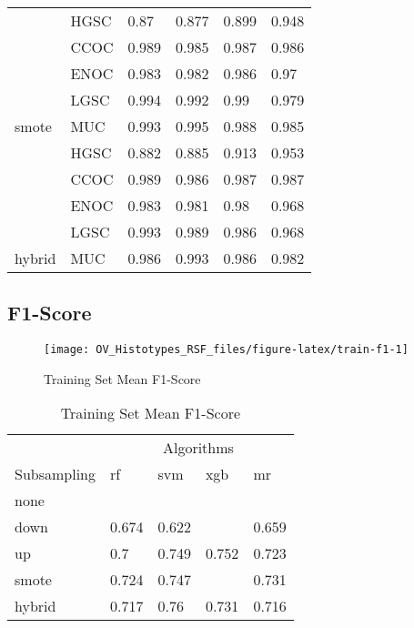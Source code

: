 \documentclass[
]{report}
\begin{document}
\begin{table}
\begin{tabular}[t]{l|l|l|l|l|l}
\cline{1-6}
 & HGSC & 0.87 & 0.877 & 0.899 & 0.948\\
\cline{2-6}
 & CCOC & 0.989 & 0.985 & 0.987 & 0.986\\
\cline{2-6}
 & ENOC & 0.983 & 0.982 & 0.986 & 0.97\\
\cline{2-6}
 & LGSC & 0.994 & 0.992 & 0.99 & 0.979\\
\cline{2-6}
\multirow{-5}{*}{\raggedright\arraybackslash smote} & MUC & 0.993 & 0.995 & 0.988 & 0.985\\
\cline{1-6}
 & HGSC & 0.882 & 0.885 & 0.913 & 0.953\\
\cline{2-6}
 & CCOC & 0.989 & 0.986 & 0.987 & 0.987\\
\cline{2-6}
 & ENOC & 0.983 & 0.981 & 0.98 & 0.968\\
\cline{2-6}
 & LGSC & 0.993 & 0.989 & 0.986 & 0.968\\
\cline{2-6}
\multirow{-5}{*}{\raggedright\arraybackslash hybrid} & MUC & 0.986 & 0.993 & 0.986 & 0.982\\
\hline
\end{tabular}
\end{table}

\subsection{F1-Score}\label{f1-score-1}

\begin{figure}[H]

{\centering \texttt{[image: OV\_Histotypes\_RSF\_files/figure-latex/train-f1-1]} 

}

\caption{Training Set Mean F1-Score}\label{fig:train-f1}
\end{figure}

\begin{table}

\caption{\label{tab:train-f1-table}Training Set Mean F1-Score}
\centering
\begin{tabular}[t]{l|l|l|l|l}
\hline
\multicolumn{1}{c|}{ } & \multicolumn{4}{c}{Algorithms} \\
\cline{2-5}
Subsampling & rf & svm & xgb & mr\\
\hline
none & \cellcolor[HTML]{FFD700}{0.819} & \cellcolor[HTML]{FFD700}{0.799} & \cellcolor[HTML]{FF0000}{0.78} & \cellcolor[HTML]{FF0000}{0.851}\\
\hline
down & 0.674 & 0.622 & \cellcolor[HTML]{FF0000}{0.415} & 0.659\\
\hline
up & 0.7 & 0.749 & 0.752 & 0.723\\
\hline
smote & 0.724 & 0.747 & \cellcolor[HTML]{90ee90}{0.771} & 0.731\\
\hline
hybrid & 0.717 & 0.76 & 0.731 & 0.716\\
\hline
\end{tabular}
\end{table}
\end{document}
